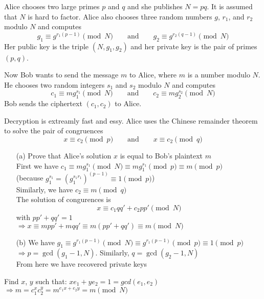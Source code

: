 \begin{exer}[3.11] Alice chooses two large primes $p$ and $q$ and she publishes $N=pq$. It is assumed that $N$ is hard to factor. Alice also chooses three random numbers $g$, $r_1$, and $r_2$ modulo $N$ and computes $$g_1 \equiv g^{r_1(p-1)} \pmod{N} \qquad \text{and} \qquad g_2 \equiv g^{r_2(q-1)} \pmod{N}$$ Her public key is the triple $(N, g_1, g_2)$ and her private key is the pair of primes $(p, q)$.
	
	Now Bob wants to send the message $m$ to Alice, where $m$ is a number modulo $N$. He chooses two random integers $s_1$ and $s_2$ modulo $N$ and computes $$c_1 \equiv mg_1^{s_1} \pmod{N} \qquad \text{and} \qquad c_2 \equiv mg_2^{s_2} \pmod{N}$$ Bob sends the ciphertext $(c_1, c_2)$ to Alice.
	
	Decryption is extreamly fast and essy. Alice uses the Chinese remainder theorem to solve the pair of congruences \[x \equiv c_2 \pmod{p} \qquad \text{and} \qquad x \equiv c_2 \pmod{q}\]
	\begin{enumerate}
		\item [(a)] Prove that Alice's solution $x$ is equal to Bob's plaintext $m$ \\ First we have $c_1 \equiv mg_1^{s_1} \pmod{N} \equiv mg_1^{s_1} \pmod{p} \equiv m \pmod{p}$ \\ (because $g_1^{s_1} = (g_1^{s_1 r_1})^{(p-1)} \equiv 1 \pmod{p}$) \\ Similarly, we have $c_2 \equiv m \pmod{q}$ \\ The solution of congurences is \[x \equiv c_1 q q' + c_2 p p' \pmod N\] with $p p' + q q' = 1$ \\ $\Rightarrow x \equiv m p p' + m q q' \equiv m(p p' + q q') \equiv m \pmod N$
		\item [(b)] We have $g_1 \equiv g^{r_1 (p-1)} \pmod N \equiv g^{r_1 (p-1)} \pmod p \equiv 1 \pmod p$ \\ $\Rightarrow p = \gcd(g_1-1, N)$. Similarly, $q = \gcd(g_2-1, N)$ \\ From here we have recovered private keys
	\end{enumerate}
\end{exer}

\begin{exer}[3.13] Find $x$, $y$ such that: $xe_1 + ye_2=1=gcd(e_1,e_2)$ \\ $\Rightarrow m=c_1^x c_2^y = m^{e_1 x + e_2 y} = m \pmod{N}$
\end{exer}

